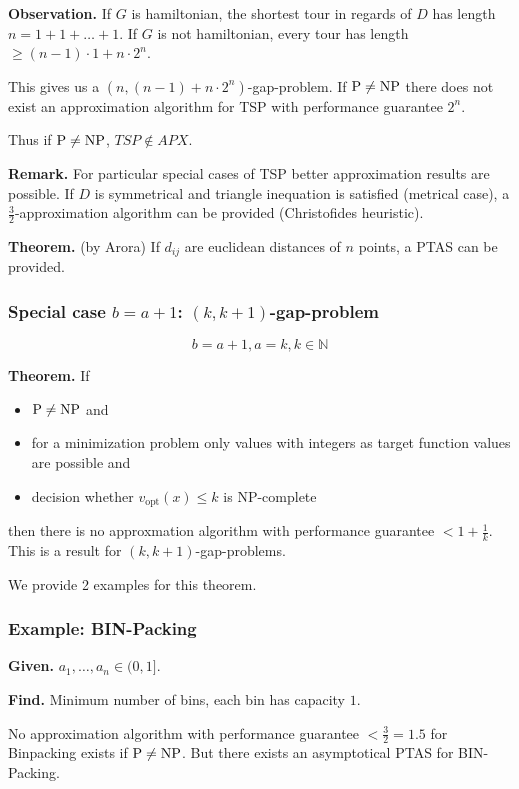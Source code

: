 \documentclass[a4paper]{article}
\newcommand{\given}[1]{\textbf{Given.} #1\par}
\newcommand{\find}[1]{\textbf{Find.} #1\par}
\newcommand{\cls}[1]{\rm{#1}}
\newenvironment{spec}[0]{\begin{framed}}{\end{framed}}
\begin{document}
\textbf{Observation.}
  If $G$ is hamiltonian, the shortest tour in regards of $D$ has length
  $n = 1 + 1 + \ldots + 1$. If $G$ is not hamiltonian, every tour has length
  $\geq (n-1)\cdot 1 + n \cdot 2^n$.

This gives us a $(n, (n-1) + n\cdot 2^n)$-gap-problem.
If $\cls{P} \neq \cls{NP}$ there does not exist an approximation algorithm for TSP
with performance guarantee $2^n$.

Thus if $\cls{P} \neq \cls{NP}$, $TSP \notin APX$.

\textbf{Remark.}
  For particular special cases of TSP better approximation results are
  possible. If $D$ is symmetrical and triangle inequation is satisfied
  (metrical case), a $\frac32$-approximation algorithm can be provided
  (Christofides heuristic).

\textbf{Theorem.} (by Arora)
  If $d_{ij}$ are euclidean distances of $n$ points, a PTAS can be provided.

\subsubsection{Special case $b = a + 1$: $(k, k+1)$-gap-problem}
%
\[
  b = a + 1, a = k, k \in \mathbb{N}
\]

\textbf{Theorem.} If
\begin{itemize}
  \item $\cls{P} \neq \cls{NP}$ and
  \item for a minimization problem only values with integers as
        target function values are possible and
  \item decision whether $v_{\text{opt}}(x) \leq k$
        is \cls{NP}-complete
\end{itemize}
then there is no approxmation algorithm with performance guarantee
$< 1 + \frac1{k}$. This is a result for $(k, k+1)$-gap-problems.

We provide 2 examples for this theorem.

\subsubsection{Example: BIN-Packing}
%
\begin{spec}
  \given{$a_1,\ldots,a_n \in (0,1]$.}
  \find{Minimum number of bins, each bin has capacity $1$.}
\end{spec}

No approximation algorithm with performance guarantee $< \frac32 = 1.5$
for Binpacking exists if $\cls{P} \neq \cls{NP}$.
But there exists an asymptotical PTAS for BIN-Packing.
\end{document}
